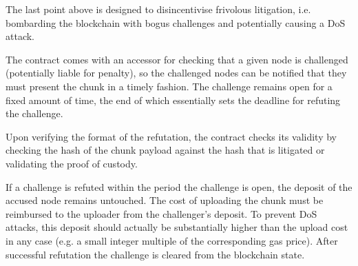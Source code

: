 The last point above is designed to disincentivise frivolous litigation, i.e. bombarding the blockchain with bogus challenges and potentially causing a DoS attack.

The contract comes with an accessor for checking that a given node is challenged (potentially liable for penalty), so the challenged nodes can be notified that they must present the chunk in a timely fashion. The challenge remains open for a fixed amount of time, the end of which essentially sets the deadline for refuting the challenge. 





Upon verifying the format of the refutation, the contract checks its validity by checking the hash of the chunk payload against the hash that is litigated or validating the proof of custody. 

If a challenge is refuted within the period the challenge is open, the deposit of the accused node remains untouched. The cost of uploading the chunk must be reimbursed to the uploader from the challenger's deposit. To prevent DoS attacks, this deposit should actually be substantially higher than the upload cost in any case (e.g. a small integer multiple of the corresponding gas price). After successful refutation the challenge is cleared from the blockchain state.

